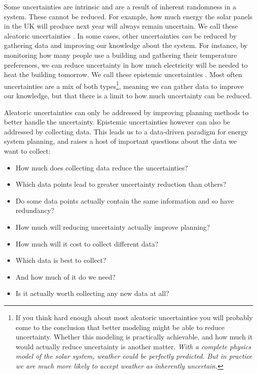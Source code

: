 Some uncertainties are intrinsic and are a result of inherent randomness in a system. These cannot be reduced. For example, how much energy the solar panels in the UK will produce next year will always remain uncertain. We call these aleatoric uncertainties . In some cases, other uncertainties \textit{can} be reduced by gathering data and improving our knowledge about the system. For instance, by monitoring how many people use a building and gathering their temperature preferences, we can reduce uncertainty in how much electricity will be needed to heat the building tomorrow. We call these epistemic uncertainties . Most often uncertainties are a mix of both types\footnote{If you think hard enough about most aleatoric uncertainties you will probably come to the conclusion that better modeling might be able to reduce uncertainty. Whether this modeling is practically achievable, and how much it would actually reduce uncertainty is another matter. \textit{With a complete physics model of the solar system, weather could be perfectly predicted. But in practice we are much more likely to accept weather as inherently uncertain.}}, meaning we can gather data to improve our knowledge, but that there is a limit to how much uncertainty can be reduced.

Aleatoric uncertainties can only be addressed by improving planning methods to better handle the uncertainty. Epistemic uncertainties however can also be addressed by collecting data. This leads us to a data-driven paradigm for energy system planning, and raises a host of important questions about the data we want to collect:
\begin{itemize}[label=--]
    \item How much does collecting data reduce the uncertainties?
    \item Which data points lead to greater uncertainty reduction than others?
    \item Do some data points actually contain the same information and so have redundancy?
    \item How much will reducing uncertainty actually improve planning?
    \item How much will it cost to collect different data?
    \item Which data is best to collect?
    \item And how much of it do we need?
    \item Is it actually worth collecting any new data at all?\\
\end{itemize}

